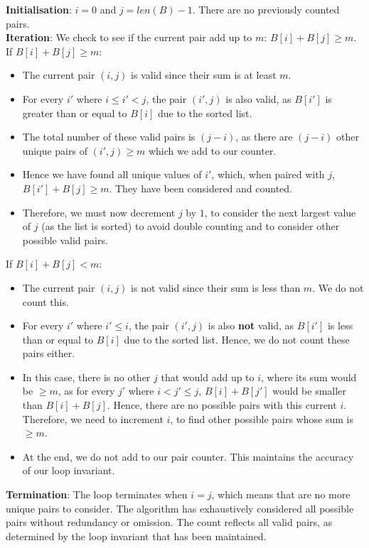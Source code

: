 \documentclass[12pt]{article}
\begin{document}
\textbf{Initialisation}: $i = 0$ and $j = len(B) - 1$. There are no previously counted pairs. \\

\textbf{Iteration}: We check to see if the current pair add up to $m$: $B[i] + B[j] \ge m$. \\

If $B[i] + B[j] \ge m$:
\begin{itemize}
    \item The current pair $(i, j)$ is valid since their sum is at least $m$. 
    \item For every $i'$ where $i \le i' < j$, the pair $(i', j)$ is also valid, as $B[i']$ is greater than or equal to $B[i]$ due to the sorted list.
    \item The total number of these valid pairs is $(j-i)$, as there are $(j-i)$ other unique pairs of $(i', j) \ge m$ which we add to our counter. 
    \item Hence we have found all unique values of $i'$, which, when paired with $j$, $B[i'] + B[j] \ge m$. They have been considered and counted.
    \item Therefore, we must now decrement $j$ by $1$, to consider the next largest value of $j$ (as the list is sorted) to avoid double counting and to consider other possible valid pairs.
\end{itemize}

If $B[i] + B[j] < m$:
\begin{itemize}
    \item The current pair $(i, j)$ is not valid since their sum is less than $m$. We do not count this.
    \item For every $i'$ where $i' \le i$, the pair $(i', j)$ is also \textbf{not} valid, as $B[i']$ is less than or equal to $B[i]$ due to the sorted list. Hence, we do not count these pairs either.
    \item In this case, there is no other $j$ that would add up to $i$, where its sum would be $\ge m$, as for every $j'$ where $i< j' \le j$, $B[i] + B[j']$ would be smaller than $B[i] + B[j]$. Hence, there are no possible pairs with this current $i$. Therefore, we need to increment $i$, to find other possible pairs whose sum is $\ge m$.
    \item At the end, we do not add to our pair counter. This maintains the accuracy of our loop invariant.
\end{itemize}

\textbf{Termination}: The loop terminates when $i = j$, which means that are no more unique pairs to consider. The algorithm has exhaustively considered all possible pairs without redundancy or omission. The count reflects all valid pairs, as determined by the loop invariant that has been maintained. 
\end{document}
